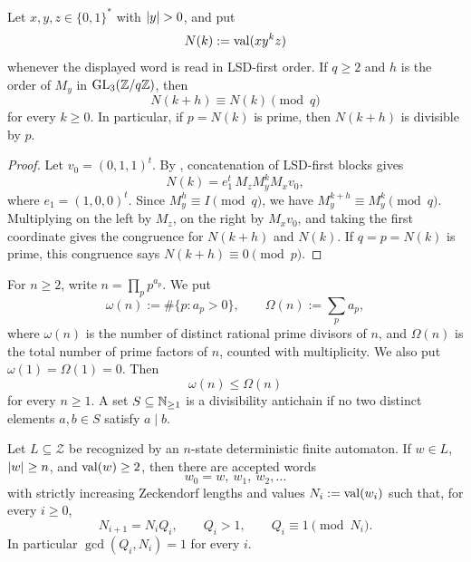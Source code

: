 \begin{lemma}
  \label{lem:zeckendorf-pumping-congruence}
  Let \(x,y,z\in\{0,1\}^\ast\) with \(\lvert y \rvert>0\), and put
  \[
    N(k):=\operatorname{val}(xy^kz)
  \]
  whenever the displayed word is read in LSD-first order. If \(q\ge2\)
  and \(h\) is the order of \(M_y\) in
  \(\operatorname{GL}_3(\mathbb{Z}/q\mathbb{Z})\), then
  \[
    N(k+h)\equiv N(k)\pmod q
  \]
  for every \(k\ge0\). In particular, if \(p=N(k)\) is prime, then
  \(N(k+h)\) is divisible by \(p\).
\end{lemma}

\begin{proof}
  Let \(v_0=(0,1,1)^t\). By
  , concatenation of
  LSD-first blocks gives
  \[
    N(k)=
    e_1^t\,M_zM_y^kM_xv_0,
  \]
  where \(e_1=(1,0,0)^t\). Since \(M_y^h\equiv I\pmod q\), we have
  \(M_y^{k+h}\equiv M_y^k\pmod q\). Multiplying on the left by
  \(M_z\), on the right by \(M_xv_0\), and taking the first coordinate
  gives the congruence for \(N(k+h)\) and \(N(k)\). If \(q=p=N(k)\) is
  prime, this congruence says \(N(k+h)\equiv0\pmod p\).
\end{proof}

\begin{definition}
  \label{def:Omega-total-prime-factor-count}
  For \(n\ge2\), write
  \(n=\prod_p p^{a_p}\). We put
  \[
    \omega(n):=\#\{p:a_p>0\},
    \qquad
    \Omega(n):=\sum_p a_p,
  \]
  where \(\omega(n)\) is the number of distinct rational prime
  divisors of \(n\), and \(\Omega(n)\) is the total number of prime
  factors of \(n\), counted with multiplicity. We also put
  \(\omega(1)=\Omega(1)=0\). Then
  \[
    \omega(n)\le \Omega(n)
  \]
  for every \(n\ge1\). A set
  \(S\subseteq\mathbb{N}_{\ge1}\) is a divisibility antichain if no two
  distinct elements \(a,b\in S\) satisfy \(a\mid b\).
\end{definition}

\begin{theorem}
  \label{thm:coprime-quotient-zeckendorf-pumping}
  Let \(L\subseteq\mathcal Z\) be recognized by an \(n\)-state
  deterministic finite automaton. If \(w\in L\), \(\lvert w \rvert\ge n\), and
  \(\operatorname{val}(w)\ge2\), then there are accepted words
  \[
    w_0=w,\ w_1,\ w_2,\ldots
  \]
  with strictly increasing Zeckendorf lengths and values
  \(N_i:=\operatorname{val}(w_i)\) such that, for every \(i\ge0\),
  \[
    N_{i+1}=N_iQ_i,\qquad Q_i>1,\qquad Q_i\equiv1\pmod {N_i}.
  \]
  In particular \(\gcd(Q_i,N_i)=1\) for every \(i\).
\end{theorem}

